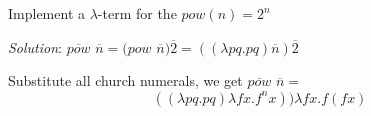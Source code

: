 \documentclass[a4paper, 11pt]{article}
\begin{document}
	Implement a  $ \lambda $-term for the $pow(n) = 2^n$
	
	{\em Solution}: $\overline{pow}$ $\overline{n} 
	=  (pow$ $\overline{n}) \overline{2} 
	=  ((\lambda p q . p q) \overline{n}) \overline{2} 
	$
	
	Substitute all church numerals, we get  $\overline{pow}$ $\overline{n} =$
	$$  ((\lambda p q . p q) \lambda f x. f^n x)) \lambda f x. f ( f x) $$
	
	
\end{document}
